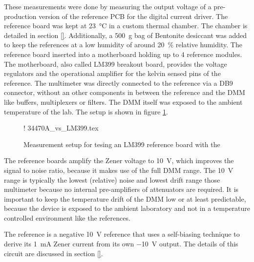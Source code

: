 These measurements were done by measuring the output voltage of a pre-production version of the reference PCB for the digital current driver. The reference board was kept at \qty{23}{\celsius} in a custom thermal chamber. The chamber is detailed in section \ref{}. Additionally, a \qty{500}{\g}  bag of Bentonite desiccant was added to keep the references at a low humidity of around \qty{20}{\percent} relative humidity. The reference board inserted into a motherboard holding up to 4 reference modules. The motherboard, also called LM399 breakout board, provides the voltage regulators and the operational amplifier for the kelvin sensed pins of the reference. The multimeter was directly connected to the reference via a DB9 connector, without an other components in between the reference and the DMM like buffers, multiplexers or filters. The DMM itself was exposed to the ambient temperature of the lab. The setup is shown in figure \ref{fig:lm399_vs_34470a_setup}.

\begin{figure}[ht]
    \centering
    \resizebox {0.8\textwidth} {!} {
        {34470A_vs_LM399.tex}
    } %
    \caption{Measurement setup for tesing an LM399 reference board with the }
    \label{fig:lm399_vs_34470a_setup}
\end{figure}

The reference boards amplify the Zener voltage to \qty{10}{\volt}, which improves the signal to noise ratio, because it makes use of the full DMM range. The \qty{10}{\volt} range is typically the lowest (relative) noise and lowest drift range those multimeter because no internal pre-amplifiers of attenuators are required. It is important to keep the temperature drift of the DMM low or at least predictable, because the device is exposed to the ambient laboratory and not in a temperature controlled environment like the references.

\newpage
The reference is a negative \qty{10}{\volt} reference that uses a self-biasing technique to derive its \qty{1}{\mA} Zener current from its own \qty{-10}{\volt} output. The details of this circuit are discussed in section \ref{}.


